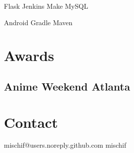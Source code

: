 \documentclass[]{deedy-resume-openfont}
\begin{document}
\begin{minipage}[t]{0.35\textwidth}
Flask \textbullet{} Jenkins \textbullet{} Make \textbullet{} MySQL


Android \textbullet{} Gradle \textbullet{} Maven
\sectionsep


\section{Awards}
\subsection{Anime Weekend Atlanta}
\sectionsep

\section{Contact}
\personal
{mischif@users.noreply.github.com}
{}
{mischif}
{}
{}
{}
\sectionsep

%
%

\end{minipage}
\hfill
\end{document}

